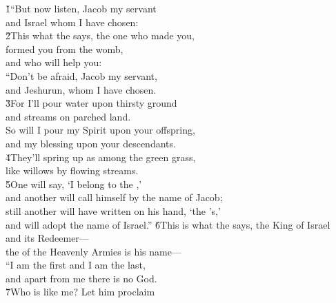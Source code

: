 \begin{poetry}
\poeml {}
\v{1}``But now listen, Jacob my servant \\
\poemll    and Israel whom I have chosen: \\
\poeml \v{2}This what the  says, the one who made you, \\
\poemll    formed you from the womb, \\
\poemlll       and who will help you: \\
\poeml ``Don't be afraid, Jacob my servant, \\
\poemll    and Jeshurun, whom I have chosen. \\
\poeml \v{3}For I'll pour water upon thirsty ground \\
\poemll    and streams on parched land. \\
\poeml So will I pour my Spirit upon your offspring, \\
\poemll    and my blessing upon your descendants. \\
\poeml \v{4}They'll spring up as among the green grass, \\
\poemll    like willows by flowing streams. \\
\poeml \v{5}One will say, `I belong to the ,' \\
\poemll    and another will call himself by the name of Jacob; \\
\poeml still another will have written on his hand, `the 's,' \\
\poemll    and will adopt the name of Israel.''
\poeml \v{6}This is what the  says, the King of Israel \\
\poemll    and its Redeemer--- \\
\poemlll       the  of the Heavenly Armies is his name--- \\
\poeml ``I am the first and I am the last, \\
\poemll    and apart from me there is no God. \\
\poeml \v{7}Who is like me? Let him proclaim \\

\end{poetry}
